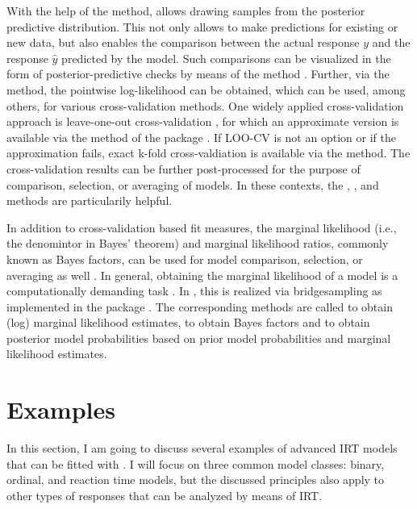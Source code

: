 \documentclass[jss]{jss}
\begin{document}
With the help of the  method,  allows
drawing samples from the posterior predictive distribution. This not
only allows to make predictions for existing or new data, but also
enables the comparison between the actual response \(y\) and the
response \(\hat{y}\) predicted by the model. Such comparisons can be
visualized in the form of posterior-predictive checks by means of the
 method \citep{gabry2019}. Further, via the
 method, the pointwise log-likelihood can be obtained,
which can be used, among others, for various cross-validation methods.
One widely applied cross-validation approach is leave-one-out
cross-validation \citep[LOO-CV;][]{vehtari2017loo}, for which an
approximate version is available via the  method of the
 package \citep{vehtari2017loo, vehtari2017psis}. If LOO-CV is
not an option or if the approximation fails, exact k-fold
cross-valdiation is available via the  method. The
cross-validation results can be further post-processed for the purpose
of comparison, selection, or averaging of models. In these contexts, the
, , and  methods
are particularily helpful.

In addition to cross-validation based fit measures, the marginal
likelihood (i.e., the denomintor in Bayes' theorem) and marginal
likelihood ratios, commonly known as Bayes factors, can be used for
model comparison, selection, or averaging as well \citep{kass1995}. In
general, obtaining the marginal likelihood of a model is a
computationally demanding task \citep{kass1995}. In , this is
realized via bridgesampling \citep{meng1996, meng2002} as implemented in
the  package \citep{bridgesampling}. The
corresponding methods are called  to obtain (log)
marginal likelihood estimates,  to obtain Bayes
factors and  to obtain posterior model probabilities
based on prior model probabilities and marginal likelihood estimates.

\hypertarget{examples}{%
\section{Examples}\label{examples}}

In this section, I am going to discuss several examples of advanced IRT
models that can be fitted with . I will focus on three common
model classes: binary, ordinal, and reaction time models, but the
discussed principles also apply to other types of responses that can be
analyzed by means of IRT.
\end{document}
